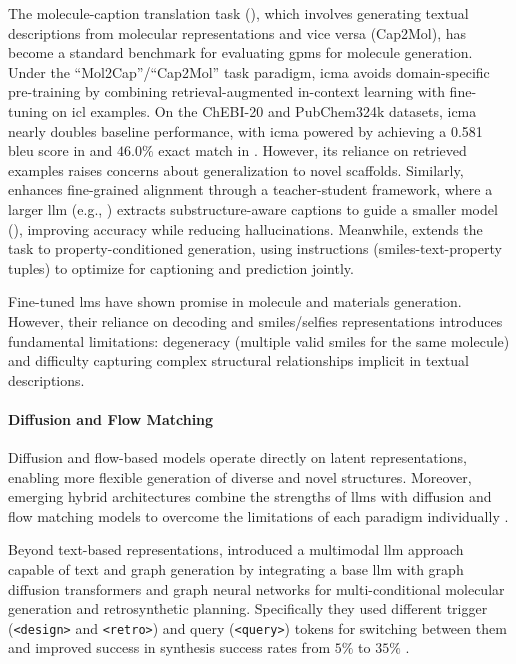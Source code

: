 The molecule-caption translation task (), which involves generating textual descriptions from molecular representations and vice versa (Cap2Mol), has become a standard benchmark for evaluating \glspl{gpm} for molecule generation. \autocite{edwards2022translation} Under the \enquote{Mol2Cap}/\enquote{Cap2Mol} task paradigm, \gls{icma} avoids domain-specific pre-training by combining retrieval-augmented in-context learning with fine-tuning on \gls{icl} examples.\autocite{li2025large} 
On the ChEBI-20\autocite{edwards2021text2mol} and PubChem324k\autocite{liu2023molca} datasets, \gls{icma} nearly doubles baseline performance, with \gls{icma} powered by achieving a 0.581 \gls{bleu} score in  and $46.0\%$ exact match in .\autocite{li2025large} 
However, its reliance on retrieved examples raises concerns about generalization to novel scaffolds. 
Similarly,  enhances fine-grained alignment through a teacher-student framework, where a larger \gls{llm} (e.g., ) extracts substructure-aware captions to guide a smaller model (), improving  accuracy while reducing hallucinations.\autocite{li2024molreflect} 
Meanwhile,  extends the task to property-conditioned generation, using instructions (\gls{smiles}-text-property tuples) to optimize for captioning and prediction jointly.\autocite{lin2025property} 

Fine-tuned \glspl{lm} have shown promise in molecule and materials generation. 
However, their reliance on decoding and \gls{smiles}/\gls{selfies} representations introduces fundamental limitations: degeneracy (multiple valid \gls{smiles} for the same molecule) and difficulty capturing complex structural relationships implicit in textual descriptions.

\paragraph{Diffusion and Flow Matching} Diffusion and flow-based models operate directly on latent representations, enabling more flexible generation of diverse and novel structures.\autocite{zhu20243m-diffusion} Moreover, emerging hybrid architectures combine the strengths of \glspl{llm} with diffusion and flow matching models to overcome the limitations of each paradigm individually \autocite{sriram2024flowllm}.

Beyond text-based representations,  introduced a multimodal \gls{llm} approach capable of text and graph generation by integrating a base \gls{llm} with graph diffusion transformers and graph neural networks for multi-conditional molecular generation and retrosynthetic planning. Specifically they used different trigger (\texttt{<design>} and \texttt{<retro>}) and query (\texttt{<query>}) tokens for switching between them and improved success in synthesis success rates from  $5\%$ to $35\%$ . \autocite{liu2024multimodal}

